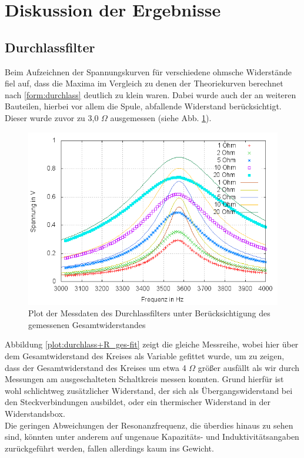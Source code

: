\section{Diskussion der Ergebnisse}

\subsection{Durchlassfilter}
Beim Aufzeichnen der Spannungskurven für verschiedene ohmsche Widerstände fiel auf, dass die Maxima im Vergleich zu denen der Theoriekurven berechnet nach \eqref{form:durchlass} deutlich zu klein waren. Dabei wurde auch der an weiteren Bauteilen, hierbei vor allem die Spule, abfallende Widerstand berücksichtigt. Dieser wurde zuvor zu 3,0 $  \Omega $ ausgemessen (siehe Abb. \ref{plot:durchlass+R_ges}).
\begin{figure}[h]
        \includegraphics[width=.9\textwidth]{images/plot/durchlassfilter+theorie+R_ges.png}
\caption{Plot der Messdaten des Durchlassfilters unter Berücksichtigung des gemessenen Gesamtwiderstandes}
\label{plot:durchlass+R_ges}
\end{figure}
Abbildung \ref{plot:durchlass+R_ges-fit} zeigt die gleiche Messreihe, wobei hier über dem Gesamtwiderstand des Kreises als Variable gefittet wurde, um zu zeigen, dass der Gesamtwiderstand des Kreises um etwa 4 $\Omega$ größer ausfällt als wir durch Messungen am ausgeschalteten Schaltkreis messen konnten. Grund hierfür ist wohl schlichtweg zusätzlicher Widerstand, der sich als Übergangswiderstand bei den Steckverbindungen ausbildet, oder ein thermischer Widerstand in der Widerstandsbox.\\
Die geringen Abweichungen der Resonanzfrequenz, die überdies hinaus zu sehen sind, könnten unter anderem auf ungenaue Kapazitäts- und Induktivitätsangaben zurückgeführt werden, fallen allerdings kaum ins Gewicht.


